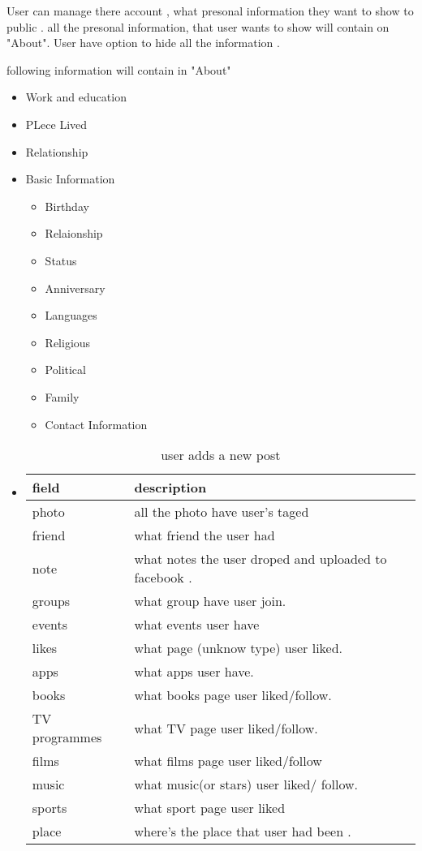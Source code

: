 User can manage there account , what presonal information they want to show to
public .
all the presonal information,  that user wants to show will contain on "About".
User have option to hide all the information .

following information will contain in "About"

\begin{itemize}
\item Work and education

\item PLece Lived

\item Relationship

\item Basic Information
    \begin{itemize}
        \item Birthday
        \item Relaionship
        \item Status
        \item Anniversary
        \item Languages
        \item Religious
        \item Political
        \item Family
        \item Contact Information
    \end{itemize}

\item \begin{table}[h]
    \centering
    \begin{tabular}{ll}
    field                 & description\\ \hline
    photo & all the photo have user's taged\\
    friend & what friend the user had\\
    note & what notes the user droped and uploaded to facebook .\\
    groups & what group have user join.\\
    events & what events user have\\
    likes & what page (unknow type) user liked.\\
    apps & what apps user have.\\
    books & what books page user liked/follow.\\
    TV programmes & what TV page user liked/follow.\\
    films & what films page user liked/follow\\
    music & what music(or stars) user liked/ follow.\\
    sports & what sport page user liked\\
    place & where's the place that user had been .\\
    \end{tabular}
    \caption{user adds a new post}
    \end{table}
\end{itemize}
